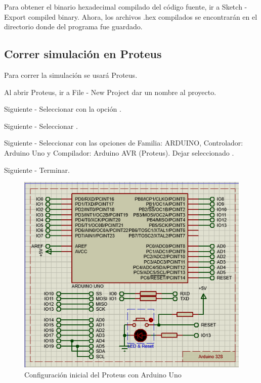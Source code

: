 \documentclass{article}
\begin{document}
    Para obtener el binario hexadecimal compilado del código fuente, ir a
    Sketch - Export compiled binary.
    Ahora, los archivos .hex compilados se encontrarán en el directorio donde
    del programa fue guardado.

    \subsection{Correr simulación en Proteus}\label{subsec:correr-simulación
    -en-proteus}

    Para correr la simulación se usará Proteus.

    \bigbreak

    Al abrir Proteus, ir a File - New Project dar un nombre al proyecto.

    \bigbreak

    Siguiente - Seleccionar 
    con la opción .

    \bigbreak

    Siguiente - Seleccionar .

    \bigbreak

    Siguiente - Seleccionar  con las opciones
    de Familia: ARDUINO, Controlador:
    Arduino Uno y Compilador: Arduino AVR (Proteus). Dejar seleccionado
    .

    \bigbreak

    Siguiente - Terminar.

    \begin{figure}[H]
        \centering
        \includegraphics[width=0.5\paperwidth]{images/sim-1}
        \caption{Configuración inicial del Proteus con Arduino Uno}\label{fig:figure4}
    \end{figure}
\end{document}
